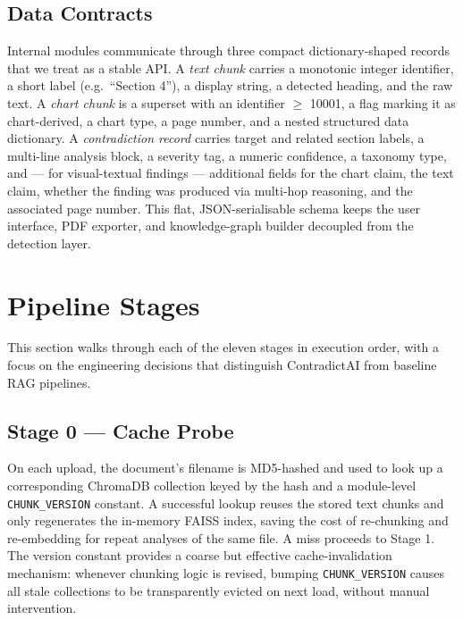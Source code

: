 \documentclass[conference]{IEEEtran}
\begin{document}
\subsection{Data Contracts}
Internal modules communicate through three compact dictionary-shaped records that we treat as a stable API. A \emph{text chunk} carries a monotonic integer identifier, a short label (e.g.\ ``Section 4''), a display string, a detected heading, and the raw text. A \emph{chart chunk} is a superset with an identifier $\geq$ 10001, a flag marking it as chart-derived, a chart type, a page number, and a nested structured data dictionary. A \emph{contradiction record} carries target and related section labels, a multi-line analysis block, a severity tag, a numeric confidence, a taxonomy type, and --- for visual-textual findings --- additional fields for the chart claim, the text claim, whether the finding was produced via multi-hop reasoning, and the associated page number. This flat, JSON-serialisable schema keeps the user interface, PDF exporter, and knowledge-graph builder decoupled from the detection layer.
\section{Pipeline Stages}\label{sec:pipeline}
This section walks through each of the eleven stages in execution order, with a focus on the engineering decisions that distinguish ContradictAI from baseline RAG pipelines.
\subsection{Stage 0 --- Cache Probe}
On each upload, the document's filename is MD5-hashed and used to look up a corresponding ChromaDB collection keyed by the hash and a module-level \texttt{CHUNK\_VERSION} constant. A successful lookup reuses the stored text chunks and only regenerates the in-memory FAISS index, saving the cost of re-chunking and re-embedding for repeat analyses of the same file. A miss proceeds to Stage 1. The version constant provides a coarse but effective cache-invalidation mechanism: whenever chunking logic is revised, bumping \texttt{CHUNK\_VERSION} causes all stale collections to be transparently evicted on next load, without manual intervention.
\end{document}
